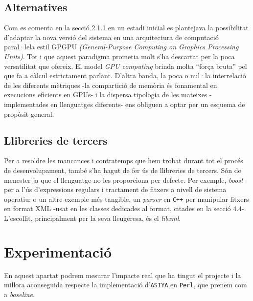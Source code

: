 \documentclass[11pt,a4paper]{article}
\begin{document}
\subsection{Alternatives}
Com es comenta en la secció 2.1.1 en un estadi inicial es plantejava la possibilitat d'adaptar la nova versió del sistema en una arquitectura de computació paral·lela estil GPGPU \textit{(General-Purpose Computing on Graphics Processing Units)}. Tot i que aquest paradigma prometia molt s'ha descartat per la poca versatilitat que ofereix. El model \textit{GPU computing} brinda molta ``força bruta'' pel que fa a càlcul estrictament parlant. D'altra banda, la poca o nul·la interrelació de les diferents mètriques -la compartició de memòria és fonamental en execucions eficients en GPUs- i la dispersa tipologia de les mateixes -implementades en llenguatges diferents- ens obliguen a optar per un esquema de propòsit general. 

\subsection{Llibreries de tercers}
Per a resoldre les mancances i contratemps que hem trobat durant tot el procés de desenvolupament, també s'ha hagut de fer ús de llibreries de tercers. Són de menester ja que el llenguatge no les proporciona per defecte. Per exemple, \textit{boost}\cite{boost} per a l'ús d'expressions regulars i tractament de fitxers a nivell de sistema operatiu; o un altre exemple més tangible, un \textit{parser} en \texttt{C++} per manipular fitxers en format XML -usat en les classes dedicades al format, citades en la secció 4.4-. L'escollit, principalment per la seva lleugeresa, és el  \textit{libxml}\cite{libxml}.



\newpage
\section{Experimentació}
En aquest apartat podrem mesurar l'impacte real que ha tingut el projecte i la millora aconseguida respecte la implementació d'\texttt{ASIYA} en \texttt{Perl}, que prenem com a \textit{baseline}.
\\
\end{document}
